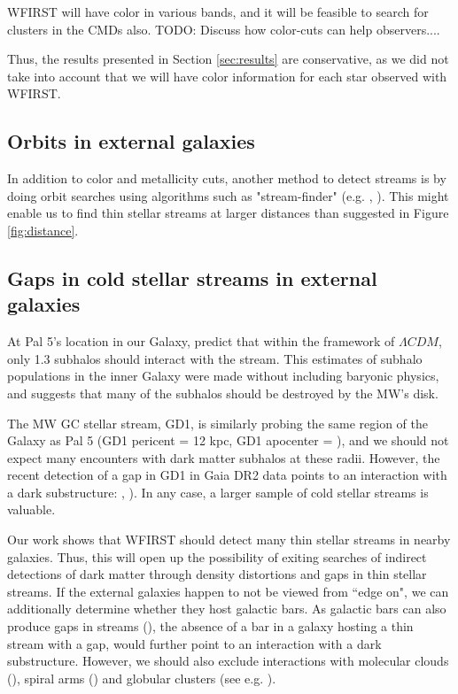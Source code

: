 \documentclass[twocolumn]{aastex62}
\newcommand{\todo}[1]{{\color{red} TODO: #1}}
\begin{document}
WFIRST will have color in various bands, and it will be feasible to search for clusters in the CMDs also. \todo{Discuss how color-cuts can help observers...}.

Thus, the results presented in Section \ref{sec:results} are conservative, as we did not take into account that we will have color information for each star observed with WFIRST. 


\subsection{Orbits in external galaxies}
In addition to color and metallicity cuts, another method to detect streams is by doing orbit searches using algorithms such as "stream-finder" (e.g. \citealt{malhan18}, \citealt{ibata19}). This might enable us to find thin stellar streams at larger distances than suggested in Figure \ref{fig:distance}. 




\subsection{Gaps in cold stellar streams in external galaxies}
 At Pal 5's location in our Galaxy, \citet{bovy17} predict that within the framework of $\Lambda CDM$, only 1.3 subhalos should interact with the stream. This estimates of subhalo populations in the inner Galaxy were made without including baryonic physics, and \citet{garrison17} suggests that many of the subhalos should be destroyed by the MW's disk. 
 
 The MW GC stellar stream, GD1, is similarly probing the same region of the Galaxy as Pal 5 (GD1 pericent = 12 kpc, GD1 apocenter = ), and we should not expect many encounters with dark matter subhalos at these radii. However, the recent detection of a gap in GD1 in Gaia DR2 data points to an interaction with a dark substructure: \citealt{price18}, \citealt{bonaca19}).  In any case,  a larger sample of cold stellar streams is valuable.  
 
Our work shows that WFIRST should detect many thin stellar streams in nearby galaxies. Thus, this will open up the possibility of exiting searches of indirect detections of dark matter through density distortions and gaps in thin stellar streams. If the external galaxies happen to not be viewed from ``edge on", we can additionally determine whether they host galactic bars. As galactic bars can also produce gaps in streams  (\citealt{pearson17}), the absence of a bar in a galaxy hosting a thin stream with a gap, would further point to an interaction with a dark substructure. However, we should also exclude interactions with molecular clouds (\citealt{amorisco16}), spiral arms (\citealt{banik19}) and globular clusters (see e.g. \citealt{bonaca19}).
\end{document}
